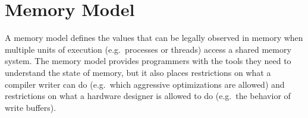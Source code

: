 %
%

%

%
%
%
%

\section{Memory Model}
\label{sec:MemoryModel}

A memory model defines the values that can be legally observed in
memory when multiple units of execution (e.g.\ processes or threads)
access a shared memory system. The memory model provides programmers
with the tools they need to understand the state of memory, but it
also places restrictions on what a compiler writer can do (e.g.\ which
aggressive optimizations are allowed) and restrictions on what a
hardware designer is allowed to do (e.g.\ the behavior of write
buffers).

